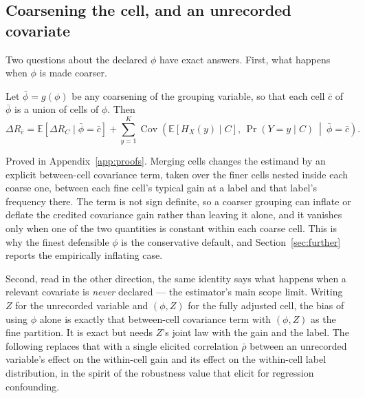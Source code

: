 \subsection{Coarsening the cell, and an unrecorded covariate}\label{sec:coarsening}

Two questions about the declared $\phi$ have exact answers. First, what happens when $\phi$
is made coarser.

\begin{proposition}\label{prop:coarsen}
Let $\bar\phi=g(\phi)$ be any coarsening of the grouping variable, so that each cell
$\bar c$ of $\bar\phi$ is a union of cells of $\phi$. Then
\begin{equation}
\Delta R_{\bar c}
=\mathbb E\!\left[\Delta R_C \mid \bar\phi=\bar c\right]
+\sum_{y=1}^K\operatorname{Cov}\!\left(\mathbb E[H_X(y)\mid C],\,
\Pr(Y=y\mid C)\ \middle|\ \bar\phi=\bar c\right).
\label{eq:coarsen}
\end{equation}
\end{proposition}

\noindent
Proved in Appendix~\ref{app:proofs}. Merging cells changes the estimand by an explicit
between-cell covariance term, taken over the finer cells nested inside each coarse one,
between each fine cell's typical gain at a label and that label's frequency there. The term is not sign definite, so a coarser grouping can inflate or
deflate the credited covariance gain rather than leaving it alone, and it vanishes only when
one of the two quantities is constant within each coarse cell. This is why the finest
defensible $\phi$ is the conservative default, and Section~\ref{sec:further} reports the
empirically inflating case.

Second, read in the other direction, the same identity says what happens when a relevant
covariate is \emph{never} declared --- the estimator's main scope limit. Writing $Z$ for the
unrecorded variable and $(\phi,Z)$ for the fully adjusted cell, the bias of using $\phi$
alone is exactly that between-cell covariance term with $(\phi,Z)$ as the fine partition. It
is exact but needs $Z$'s joint law with the gain and the label. The following replaces that
with a single elicited correlation $\bar\rho$ between an unrecorded variable's effect on the
within-cell gain and its effect on the within-cell label distribution, in the spirit of the
robustness value that \citet{cinelli2020making} elicit for regression confounding.

